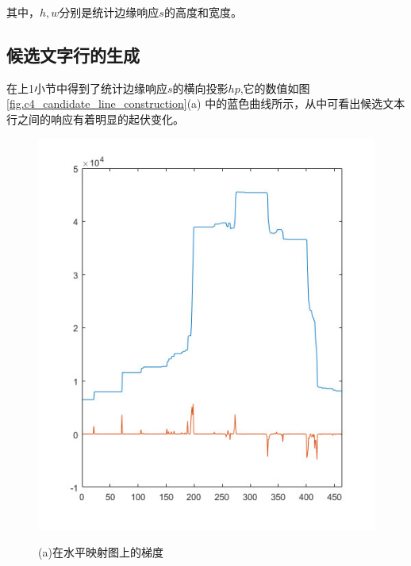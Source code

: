         其中，$h,w$分别是统计边缘响应$s$的高度和宽度。

        \subsection{候选文字行的生成}

        在上1小节中得到了统计边缘响应$s$的横向投影$hp$,它的数值如图\ref{fig.c4_candidate_line_construction}(a) 中的蓝色曲线所示，从中可看出候选文本行之间的响应有着明显的起伏变化。

        \begin{figure}[htbp]
        \begin{minipage}[t]{0.32\linewidth}
        \centering
        \includegraphics[width=\textwidth]{./figures/c4_gradient.jpg}
        \centerline{\small (a)在水平映射图上的梯度}
        \end{minipage}
        \begin{minipage}[t]{0.32\linewidth}
        \centering

\end{minipage}
\end{figure}
